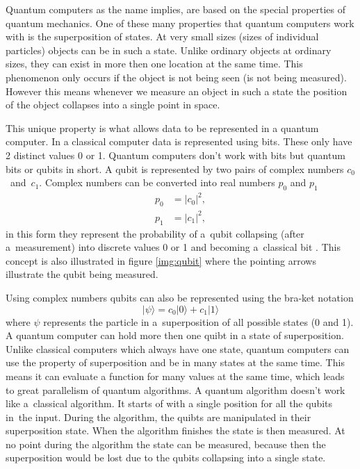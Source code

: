 Quantum computers as the name implies, are based on the special properties of quantum mechanics. One of these many properties that quantum computers work with is the superposition of states. At very small sizes (sizes of individual particles) objects can be in such a state. Unlike ordinary objects at ordinary sizes, they can exist in more then one location at the same time. This phenomenon only occurs if the object is not being seen (is not being measured). However this means whenever we measure an object in such a state the position of the object collapses into a single point in space. \cite{Yanofsky2008}


This unique property is what allows data to be represented in a quantum computer. In a classical computer data is represented using bits. These only have 2 distinct values 0 or 1. Quantum computers don't work with bits but quantum bits or qubits in short. A qubit is represented by two pairs of complex numbers $c_0$~and~$c_1$. Complex numbers can be converted into real numbers $p_0$ and $p_1$
\begin{equation}
  \begin{aligned}
    p_0 &= \lvert c_0 \rvert^2, \\
    p_1 &= \lvert c_1 \rvert^2,
  \end{aligned}
\end{equation}
in this form they represent the probability of a~qubit collapsing (after a~measurement) into discrete values 0 or 1 and becoming a~classical bit \cite{Yanofsky2008}. This concept is also illustrated in figure \ref{img:qubit} where the pointing arrows illustrate the qubit being measured.

Using complex numbers qubits can also be represented using the bra-ket notation
\begin{equation}
  \lvert\psi\rangle=c_0|0\rangle + c_1|1\rangle
\end{equation}
where $\psi$ represents the particle in a~superposition of all possible states (0 and 1). A quantum computer can hold more then one quibt in a state of superposition. Unlike classical computers which always have one state, quantum computers can use the property of superposition and be in many states at the same time. This means it can evaluate a function for many values at the same time, which leads to great parallelism of quantum algorithms. A quantum algorithm doesn't work like a~classical algorithm. It starts of with a single position for all the qubits in~the input. During the algorithm, the quibts are manipulated in their superposition state. When the algorithm finishes the state is then measured. At no point during the algorithm the state can be measured, because then the superposition would be lost due to the qubits collapsing into a single state. \cite{Yanofsky2008}

